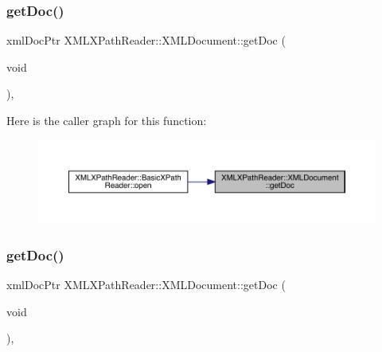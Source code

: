 \subsubsection{\texorpdfstring{getDoc()}{getDoc()}\hspace{0.1cm}{\footnotesize\ttfamily [1/2]}}
{\footnotesize\ttfamily xml\+Doc\+Ptr X\+M\+L\+X\+Path\+Reader\+::\+X\+M\+L\+Document\+::get\+Doc (\begin{DoxyParamCaption}\item[{void}]{ }\end{DoxyParamCaption})\hspace{0.3cm}{\ttfamily [inline]}, {\ttfamily [protected]}}

Here is the caller graph for this function\+:\nopagebreak
\begin{figure}[H]
\begin{center}
\leavevmode
\includegraphics[width=350pt]{d5/dfd/classXMLXPathReader_1_1XMLDocument_aa4fceaafd3c764004b6da33a26acc16d_icgraph}
\end{center}
\end{figure}
\mbox{\label{classXMLXPathReader_1_1XMLDocument_aa4fceaafd3c764004b6da33a26acc16d}} 
\subsubsection{\texorpdfstring{getDoc()}{getDoc()}\hspace{0.1cm}{\footnotesize\ttfamily [2/2]}}
{\footnotesize\ttfamily xml\+Doc\+Ptr X\+M\+L\+X\+Path\+Reader\+::\+X\+M\+L\+Document\+::get\+Doc (\begin{DoxyParamCaption}\item[{void}]{ }\end{DoxyParamCaption})\hspace{0.3cm}{\ttfamily [inline]}, {\ttfamily [protected]}}

\mbox{\label{classXMLXPathReader_1_1XMLDocument_af2b6cf36ebceab808e4856d3e7a20921}} 
